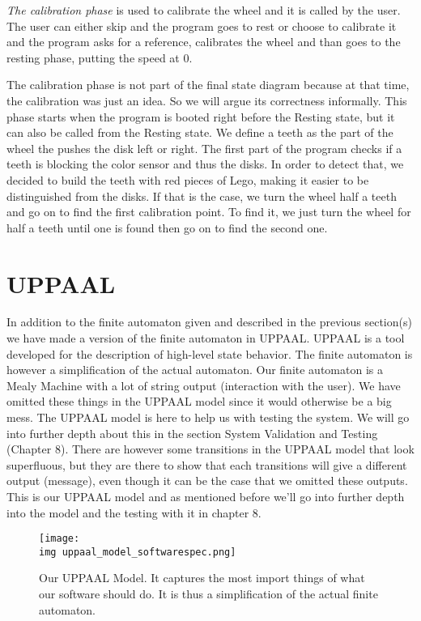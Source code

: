 \vspace{2mm}

\emph{The calibration phase} is used to calibrate the wheel and it is called by the user. The user can either skip and the program goes to rest or choose to calibrate it and the program asks for a reference, calibrates the wheel and than goes to the resting phase, putting the speed at 0.

The calibration phase is not part of the final state diagram because at that time, the calibration was just an idea. So we will argue its correctness informally. This phase starts when the program is booted right before the Resting state, but it can also be called from the Resting state. We define a teeth as the part of the wheel the pushes the disk left or right. The first part of the program checks if a teeth is blocking the color sensor and thus the disks. In order to detect that, we decided to build the teeth with red pieces of Lego, making it easier to be distinguished from the disks. If that is the case, we turn the wheel half a teeth and go on to find the first calibration point. To find it, we just turn the wheel for half a teeth until one is found then go on to find the second one. \newpage

\section{UPPAAL}
In addition to the finite automaton given and described in the previous section(s) we have made a version of the finite automaton in UPPAAL. UPPAAL is a tool developed for the description of high-level state behavior. The finite automaton is however a simplification of the actual automaton. Our finite automaton is a Mealy Machine with a lot of string output (interaction with the user). We have omitted these things in the UPPAAL model since it would otherwise be a big mess. The UPPAAL model is here to help us with testing the system. We will go into further depth about this in the section System Validation and Testing (Chapter 8). There are however some transitions in the UPPAAL model that look superfluous, but they are there to show that each transitions will give a different output (message), even though it can be the case that we omitted these outputs. This is our UPPAAL model and as mentioned before we'll go into further depth into the model and the testing with it in chapter 8. 

\begin{figure}[h!]
\centering
\texttt{[image: \\img uppaal\_model\_softwarespec.png]}
\caption{Our UPPAAL Model. It captures the most import things of what our software should do. It is thus a simplification of the actual finite automaton.}
\end{figure}


